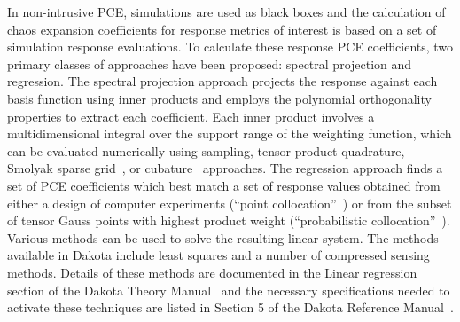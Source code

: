 In non-intrusive PCE, simulations are used as black boxes and the
calculation of chaos expansion coefficients for response metrics of
interest is based on a set of simulation response evaluations. To
calculate these response PCE coefficients, two primary classes of
approaches have been proposed: spectral projection and 
regression. The spectral projection approach projects the response
against each basis function using inner products and employs the
polynomial orthogonality properties to extract each coefficient. Each
inner product involves a multidimensional integral over the support
range of the weighting function, which can be evaluated numerically
using sampling, tensor-product quadrature, Smolyak sparse
grid~\cite{Smolyak_63}, or cubature~\cite{stroud} approaches. The
regression approach finds a set of PCE coefficients which best match a set of
response values obtained from either a design of computer experiments
(``point collocation''~\cite{pt_colloc1}) or from the subset of tensor
Gauss points with highest product weight (``probabilistic
collocation''~\cite{Tat95}). Various methods can be used to solve the resulting linear
system. The methods available in Dakota include least squares and a number of 
compressed sensing methods. Details of these methods are documented in the
Linear regression section of the Dakota Theory Manual~\cite{TheoMan} and 
the necessary specifications needed to activate these techniques are listed 
in Section 5 of the Dakota Reference Manual~\cite{RefMan}.

